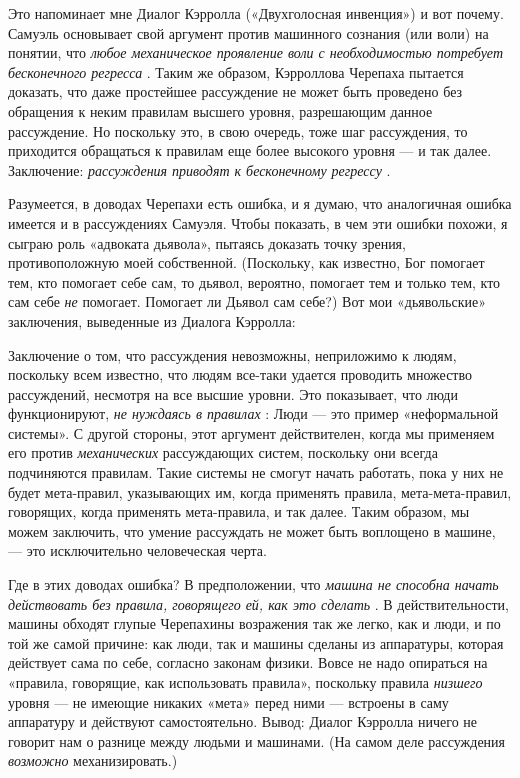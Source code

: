 \documentclass[../main.tex]{subfiles}
\begin{document}
Это напоминает мне Диалог Кэрролла («Двухголосная инвенция») и вот почему. Самуэль основывает свой аргумент против машинного сознания (или воли) на понятии, что \emph{любое механическое проявление воли с необходимостью потребует бесконечного регресса} . Таким же образом, Кэрроллова Черепаха пытается доказать, что даже простейшее рассуждение не может быть проведено без обращения к неким правилам высшего уровня, разрешающим данное рассуждение. Но поскольку это, в свою очередь, тоже шаг рассуждения, то приходится обращаться к правилам еще более высокого уровня --- и так далее. Заключение: \emph{рассуждения приводят к бесконечному регрессу} .

Разумеется, в доводах Черепахи есть ошибка, и я думаю, что аналогичная ошибка имеется и в рассуждениях Самуэля. Чтобы показать, в чем эти ошибки похожи, я сыграю роль «адвоката дьявола», пытаясь доказать точку зрения, противоположную моей собственной. (Поскольку, как известно, Бог помогает тем, кто помогает себе сам, то дьявол, вероятно, помогает тем и только тем, кто сам себе \emph{не} помогает. Помогает ли Дьявол сам себе?) Вот мои «дьявольские» заключения, выведенные из Диалога Кэрролла:

Заключение о том, что рассуждения невозможны, неприложимо к людям, поскольку всем известно, что людям все-таки удается проводить множество рассуждений, несмотря на все высшие уровни. Это показывает, что люди функционируют, \emph{не нуждаясь в правилах} : Люди --- это пример «неформальной системы». С другой стороны, этот аргумент действителен, когда мы применяем его против \emph{механических} рассуждающих систем, поскольку они всегда подчиняются правилам. Такие системы не смогут начать работать, пока у них не будет мета-правил, указывающих им, когда применять правила, мета-мета-правил, говорящих, когда применять мета-правила, и так далее. Таким образом, мы можем заключить, что умение рассуждать не может быть воплощено в машине, --- это исключительно человеческая черта.

Где в этих доводах ошибка? В предположении, что \emph{машина не способна начать действовать без правила, говорящего ей, как это сделать} . В действительности, машины обходят глупые Черепахины возражения так же легко, как и люди, и по той же самой причине: как люди, так и машины сделаны из аппаратуры, которая действует сама по себе, согласно законам физики. Вовсе не надо опираться на «правила, говорящие, как использовать правила», поскольку правила \emph{низшего} уровня --- не имеющие никаких «мета» перед ними --- встроены в саму аппаратуру и действуют самостоятельно. Вывод: Диалог Кэрролла ничего не говорит нам о разнице между людьми и машинами. (На самом деле рассуждения \emph{возможно} механизировать.)
\end{document}
